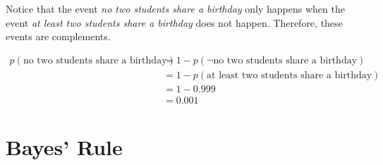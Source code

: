 \documentclass[assignment01_Solutions]{subfiles}
\begin{document}
\begin{exercise}[(10 minutes)]
\begin{boxedsolution}
Notice that the event \emph{no two students share a birthday} only happens when the event \emph{at least two students share a birthday} does not happen.  Therefore, these events are complements.

\begin{align}
p(\mbox{no two students share a birthday}) &= 1 - p( \neg \mbox{no two students share a birthday})  \nonumber\\
&= 1 - p(\mbox{at least two students share a birthday}) \nonumber \\
&= 1 - 0.999  \nonumber\\
&= 0.001  \nonumber
\end{align}
\end{boxedsolution}

\ees
\end{exercise}

\section{Bayes' Rule}
\end{document}
